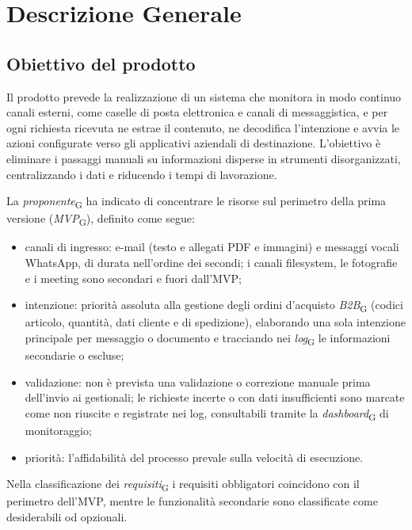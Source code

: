 \section{Descrizione Generale}
\label{sec:descrizione}

\subsection{Obiettivo del prodotto}
Il prodotto prevede la realizzazione di un sistema che monitora in modo continuo canali esterni, come caselle di posta elettronica e canali di messaggistica, e per ogni richiesta ricevuta ne estrae il contenuto, ne decodifica l'intenzione e avvia le azioni configurate verso gli applicativi aziendali di destinazione. L'obiettivo è eliminare i passaggi manuali su informazioni disperse in strumenti disorganizzati, centralizzando i dati e riducendo i tempi di lavorazione.

La \textit{proponente}\textsubscript{G} ha indicato di concentrare le risorse sul perimetro della prima versione (\textit{MVP}\textsubscript{G}), definito come segue:
	\begin{itemize}
		\item canali di ingresso: e-mail (testo e allegati PDF e immagini) e messaggi vocali WhatsApp, di durata nell'ordine dei secondi; i canali filesystem, le fotografie e i meeting sono secondari e fuori dall'MVP;
		\item intenzione: priorità assoluta alla gestione degli ordini d'acquisto \textit{B2B}\textsubscript{G} (codici articolo, quantità, dati cliente e di spedizione), elaborando una sola intenzione principale per messaggio o documento e tracciando nei \textit{log}\textsubscript{G} le informazioni secondarie o escluse;
		\item validazione: non è prevista una validazione o correzione manuale prima dell'invio ai gestionali; le richieste incerte o con dati insufficienti sono marcate come non riuscite e registrate nei log, consultabili tramite la \textit{dashboard}\textsubscript{G} di monitoraggio;
		\item priorità: l'affidabilità del processo prevale sulla velocità di esecuzione.
	\end{itemize}
Nella classificazione dei \textit{requisiti}\textsubscript{G} i requisiti obbligatori coincidono con il perimetro dell'MVP, mentre le funzionalità secondarie sono classificate come desiderabili od opzionali.

